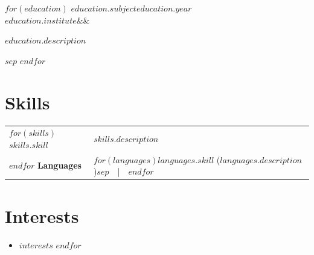 \documentclass[a4paper,11pt]{article}
\newcommand{\entry}[4]{%
  {\bfseries #1}\hfill{\color{comment}#2}\\
  {\color{accent}#3}\ifx&#4&\else{\color{comment}~~\textbullet~~#4}\fi\par}
\newcommand{\sep}{{\color{rulecolour}~~|~~}}
\begin{document}
$for(education)$
\entry{$education.subject$}{$education.year$}{$education.institute$}{}
{\small $education.description$}\par
$sep$\medskip
$endfor$


\section{Skills}

\begin{tabularx}{\linewidth}{@{}l>{\raggedright\arraybackslash}X@{}}
$for(skills)$
\textbf{$skills.skill$} & $skills.description$\\
$endfor$
\textbf{Languages} & $for(languages)$$languages.skill$ {\color{comment}($languages.description$)}$sep$\sep{}$endfor$\\
\end{tabularx}


\section{Interests}

\begin{itemize}
$for(interests)$
\item $interests$
$endfor$
\end{itemize}
\end{document}
